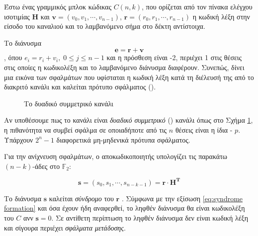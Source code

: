 Έστω ένας γραμμικός μπλοκ κώδικας $C(n,k)$, που ορίζεται από τον πίνακα ελέγχου ισοτιμίας $\mathbf{H}$ και $\mathbf{v}=\left(v_0, v_1,\cdots,v_{n-1}\right)$, $\mathbf{r}=\left(r_0, r_1,\cdots,r_{n-1}\right)$ η κωδική λέξη στην είσοδο του καναλιού και το λαμβανόμενο σήμα στο δέκτη αντίστοιχα.

Το διάνυσμα $$\mathbf{e}=\mathbf{r}+\mathbf{v}$$, όπου $e_i=r_i+v_i,\;0\leq j\leq n-1$ και η πρόσθεση είναι -2, περιέχει 1 στις θέσεις στις οποίες η κωδικολέξη και το λαμβανόμενο διάνυσμα διαφέρουν. Συνεπώς, δίνει μια εικόνα των σφαλμάτων που υφίσταται η κωδική λέξη κατά τη διέλευσή της από το διακριτό κανάλι και καλείται πρότυπο σφάλματος ().

\begin{figure}[h]
\caption{Το δυαδικό συμμετρικό κανάλι}
\label{fig:BSC channel}
\end{figure}

Αν υποθέσουμε πως το κανάλι είναι \textit{δυαδικό συμμετρικό} () κανάλι όπως στο Σχήμα \ref{fig:BSC channel}, η πιθανότητα να συμβεί σφάλμα σε οποιαδήποτε από τις $n$ θέσεις είναι η ίδια - $p$. Υπάρχουν $2^n-1$ διαφορετικά μη-μηδενικά πρότυπα σφάλματος. 

Για την ανίχνευση σφαλμάτων, ο αποκωδικοποιητής υπολογίζει τις παρακάτω $(n-k)$-άδες στο $\mathbb{F}_2$:

\begin{equation}
\mathbf{s} = \left(s_0, s_1, \cdots, s_{n-k-1}\right) = \mathbf{r}\cdot\mathbf{H^T}
\label{eq:syndrome formation}
\end{equation}

Το διάνυσμα $\mathbf{s}$ καλείται \textit{σύνδρομο} του $\mathbf{r}$ \cite{ryan2009channel}. Σύμφωνα με την εξίσωση \ref{eq:syndrome formation} και όσα έχουν ήδη αναφερθεί, το ληφθέν διάνυσμα θα είναι κωδικολέξη του $C$ ανν $\mathbf{s}=0$. Σε αντίθετη περίπτωση το ληφθέν διάνυσμα δεν είναι κωδική λέξη και σίγουρα περιέχει \textit{σφάλματα μετάδοσης}.

